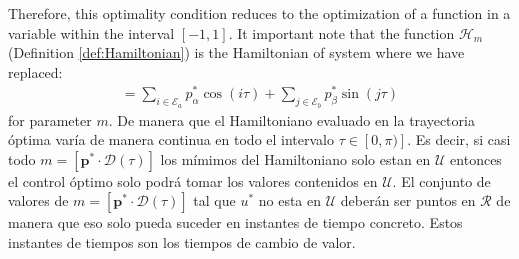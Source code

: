 Therefore, this optimality condition reduces to the optimization of a function in a variable within the interval $ [- 1,1] $. It important note that the function $\mathcal{H}_m$ (Definition \ref{def:Hamiltonian}) is the Hamiltonian of system where we have replaced: 
\begin{gather}
	[\bm{p}^* \cdot \bm{\mathcal{D}}(\tau)] = \sum_{i \in \mathcal{E}_a} p^*_\alpha \cos(i\tau) + \sum_{j \in \mathcal{E}_b} p^*_\beta \sin(j\tau) 
\end{gather}
for parameter $m$. 
%
De manera que el Hamiltoniano evaluado en la trayectoria óptima varía de manera continua en todo el intervalo $\tau \in [0,\pi)]$. Es decir, si casi todo $m = [\bm{p}^* \cdot \bm{\mathcal{D}}(\tau)]$ los mímimos del Hamiltoniano solo estan en $\mathcal{U}$ entonces el control óptimo solo podrá tomar los valores contenidos en $\mathcal{U}$. El conjunto de valores de $m = [\bm{p}^* \cdot \bm{\mathcal{D}}(\tau)]$  tal que $u^*$ no esta en $\mathcal{U}$ deberán ser puntos en $\mathcal{R}$ de manera que eso solo pueda suceder en instantes de tiempo concreto. Estos instantes de tiempos son los tiempos de cambio de valor.

